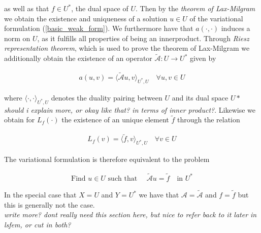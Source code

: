 \documentclass[../draft_1.tex]{subfiles}
\begin{document}
as well as that $f \in U^*$, the dual space of $U$. Then by the \textit{theorem of Lax-Milgram} we obtain the existence and uniqueness of a solution $u \in U$ of the variational formulation (\ref{basic_weak_form}). We furthermore have that $a(\cdot, \cdot)$ induces a norm on $U$, as it fulfills all properties of being an innerproduct. Through \textit{Riesz representation theorem}, which is used to prove the theorem of Lax-Milgram we additionally obtain the existence of an operator $\tilde{\mathcal{A}} : U \rightarrow U^*$ given by
\begin{ceqn}
\begin{align}
a(u,v) = \langle \tilde{\mathcal{A}} u, v \rangle_{U^*, U} \quad \forall u, v \in U
\end{align}
\end{ceqn}
where $\langle \cdot, \cdot \rangle_{U^*, U}$ denotes the duality pairing between $U$ and its dual space $U*$ \textit{should i explain more, or okay like that? in terms of inner product?}. Likewise we obtain for $L_f(\cdot)$ the existence of an unique element $\tilde{f}$ through the relation
\begin{ceqn}
\begin{align}
L_f(v) = \langle \tilde{f}, v \rangle_{U^*, U} \quad \forall v \in U
\end{align} 
\end{ceqn}
The variational formulation is therefore equivalent to the problem 
\begin{ceqn}
\begin{align}
\text{Find } u \in U \text{ such that } \quad \tilde{\mathcal{A}} u = \tilde{f} \quad  \text{in } U^*
\end{align}
\end{ceqn}
In the special case that $X = U$ and $Y = U^*$ we have that $ \mathcal{A} = \tilde{\mathcal{A}}$ and $ f = \tilde{f}$ but this is generally not the case. \\
\textit{write more? dont really need this section here, but nice to refer back to it later in lsfem, or cut in both?} 
\end{document}
